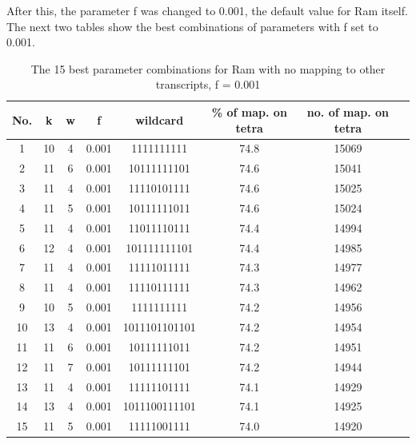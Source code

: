\documentclass[times, utf8, zavrsni, numeric]{fer}
\begin{document}
After this, the parameter f was changed to 0.001, the default value for Ram itself. The next two tables 
show the best combinations of parameters with f set to 0.001.

\begin{longtable}{cccccccc}
    \caption {The 15 best parameter combinations for Ram with no mapping to other transcripts, f = 0.001}
    \label {bestRamNoOther2} \\
    \hline \multicolumn{1}{c}{\textbf{No.}} & \multicolumn{1}{c}{\textbf{k}} & \multicolumn{1}{c}{\textbf{w}}  
    & \multicolumn{1}{c}{\textbf{f}} & \multicolumn{1}{c}{\textbf{wildcard}} & \multicolumn{1}{c}{\textbf{\% of map. on tetra}}
    & \multicolumn{1}{c}{\textbf{no. of map. on tetra}}  \\ \hline
    \endfirsthead
    1 & 10 & 4 & 0.001 & 1111111111 & 74.8 & 15069 \\ \hline
    2 & 11 & 6 & 0.001 & 10111111101 & 74.6 & 15041 \\ \hline
    3 & 11 & 4 & 0.001 & 11110101111 & 74.6 & 15025 \\ \hline
    4 & 11 & 5 & 0.001 & 10111111011 & 74.6 & 15024 \\ \hline
    5 & 11 & 4 & 0.001 & 11011110111 & 74.4 & 14994 \\ \hline
    6 & 12 & 4 & 0.001 & 101111111101 & 74.4 & 14985 \\ \hline
    7 & 11 & 4 & 0.001 & 11111011111 & 74.3 & 14977 \\ \hline
    8 & 11 & 4 & 0.001 & 11110111111 & 74.3 & 14962 \\ \hline
    9 & 10 & 5 & 0.001 & 1111111111 & 74.2 & 14956 \\ \hline
    10 & 13 & 4 & 0.001 & 1011101101101 & 74.2 & 14954 \\ \hline
    11 & 11 & 6 & 0.001 & 10111111011 & 74.2 & 14951 \\ \hline
    12 & 11 & 7 & 0.001 & 10111111101 & 74.2 & 14944 \\ \hline
    13 & 11 & 4 & 0.001 & 11111101111 & 74.1 & 14929 \\ \hline
    14 & 13 & 4 & 0.001 & 1011100111101 & 74.1 & 14925 \\ \hline
    15 & 11 & 5 & 0.001 & 11111001111 & 74.0 & 14920 \\ \hline
\end{longtable}
\end{document}
